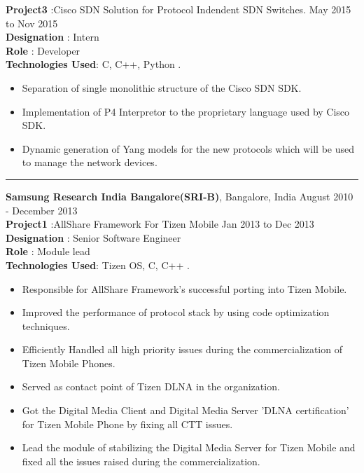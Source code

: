 \documentclass{resumeclass}
\begin{document}
\begin{resume}
\textbf{Project3} :Cisco SDN Solution for Protocol Indendent SDN Switches. \hfill      May 2015 to Nov 2015 \\
\textbf{Designation} : Intern \\
\textbf{Role} : Developer \\
\textbf{Technologies Used}: C, C++, Python .

 \begin{itemize} \itemsep -2pt
  \item  Separation of single monolithic structure of the Cisco SDN SDK.
  \item Implementation of P4 Interpretor to the proprietary language used by Cisco SDK.
  \item Dynamic generation of Yang models for the new protocols which will be used to manage the network devices.
\end{itemize} \vspace{-6pt}

\hfill   
\noindent\rule{20cm}{0.4pt}

{\large \textbf{Samsung Research India Bangalore(SRI-B)}, Bangalore, India} \hfill        August 2010 - December 2013 \\[0.5pt]

\textbf{Project1} :AllShare Framework For Tizen Mobile \hfill      Jan 2013 to Dec 2013 \\
\textbf{Designation} : Senior Software Engineer \\
\textbf{Role} : Module lead \\
\textbf{Technologies Used}: Tizen OS, C, C++ .

 \begin{itemize} \itemsep -2pt
  \item  Responsible for AllShare Framework's successful porting into Tizen Mobile.
  \item  Improved the performance of protocol stack by using code optimization techniques.
    \item  Efficiently Handled all high priority issues during the commercialization of Tizen Mobile Phones.
    \item Served as contact point of Tizen DLNA in the organization.
  \item Got the Digital Media Client and Digital Media Server 'DLNA certification' for Tizen Mobile Phone by fixing all CTT issues.
  \item Lead the module of stabilizing the Digital Media Server for Tizen Mobile and fixed all the issues raised during the commercialization.
\end{itemize} \vspace{-6pt}


\end{resume}
\end{document}
